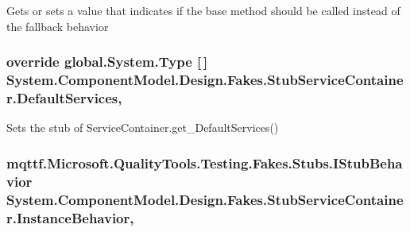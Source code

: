 Gets or sets a value that indicates if the base method should be called instead of the fallback behavior

\hypertarget{class_system_1_1_component_model_1_1_design_1_1_fakes_1_1_stub_service_container_a5635a20be83daa579d06debb46615b64}{
\subsubsection[{Default\-Services}]{\setlength{\rightskip}{0pt plus 5cm}override global.\-System.\-Type \mbox{[}$\,$\mbox{]} System.\-Component\-Model.\-Design.\-Fakes.\-Stub\-Service\-Container.\-Default\-Services\hspace{0.3cm}{\ttfamily [get]}, {\ttfamily [protected]}}}\label{class_system_1_1_component_model_1_1_design_1_1_fakes_1_1_stub_service_container_a5635a20be83daa579d06debb46615b64}


Sets the stub of Service\-Container.\-get\-\_\-\-Default\-Services()

\hypertarget{class_system_1_1_component_model_1_1_design_1_1_fakes_1_1_stub_service_container_a95f858ccdec752de8b2bfa8ac771fd49}{
\subsubsection[{Instance\-Behavior}]{\setlength{\rightskip}{0pt plus 5cm}mqttf.\-Microsoft.\-Quality\-Tools.\-Testing.\-Fakes.\-Stubs.\-I\-Stub\-Behavior System.\-Component\-Model.\-Design.\-Fakes.\-Stub\-Service\-Container.\-Instance\-Behavior\hspace{0.3cm}{\ttfamily [get]}, {\ttfamily [set]}}}\label{class_system_1_1_component_model_1_1_design_1_1_fakes_1_1_stub_service_container_a95f858ccdec752de8b2bfa8ac771fd49}



